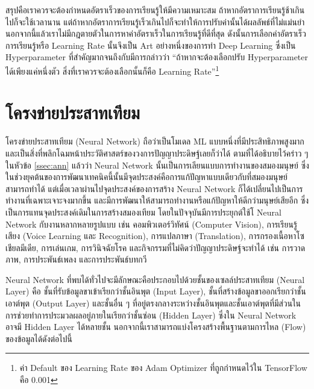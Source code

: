 สรุปคือเราควรจะต้องกำหนดอัตราเร็วของการเรียนรู้ให้มีความเหมาะสม ถ้าหากอัตราการเรียนรู้ช้าเกินไปก็จะใช้เวลานาน แต่ถ้าหากอัตราการเรียนรู้เร็วเกินไปก็จะทำให้การปรับค่านั้นได้ผลลัพธ์ที่ไม่แม่นยำ นอกจากนี้แล้วเราไม่มีกฎตายตัวในการหาค่าอัตราเร็วในการเรียนรู้ที่ดีที่สุด ดังนั้นการเลือกค่าอัตราเร็วการเรียนรู้หรือ Learning Rate นั้นจึงเป็น Art อย่างหนึ่งของการทำ Deep Learning ซึ่งเป็น Hyperparameter ที่สำคัญมากจนถึงกับมีการกล่าวว่า \enquote{ถ้าหากจะต้องเลือกปรับ Hyperparameter ได้เพียงแค่หนึ่งตัว สิ่งที่เราควรจะต้องเลือกนั้นก็คือ Learning Rate}\footnote{ค่า Default ของ Learning Rate ของ Adam Optimizer ที่ถูกกำหนดไว้ใน TensorFlow คือ 0.001}

\section{โครงข่ายประสาทเทียม}
\label{sec:nn}

โครงข่ายประสาทเทียม (Neural Network) ถือว่าเป็นโมเดล ML แบบหนึ่งที่มีประสิทธิภาพสูงมากและเป็นสิ่งที่พลิกโฉมหน้าประวัติศาสตร์ของวงการปัญญาประดิษฐ์เลยก็ว่าได้ ตามที่ได้อธิบายไว้คร่าว ๆ ในหัวข้อ \ref{ssec:ann} แล้วว่า Neural Network นั้นเป็นการเลียนแบบการทำงานของสมองมนุษย์ ซึ่งในช่วงยุคต้นของการพัฒนาเทคนิคนี้นั้นมีจุดประสงค์คือการแก้ปัญหาแบบเดียวกับที่สมองมนุษย์สามารถทำได้ แต่เมื่อเวลาผ่านไปจุดประสงค์ของการสร้าง Neural Network ก็ได้เปลี่ยนไปเป็นการทำงานที่เฉพาะเจาะจงมากขึ้น และมีการพัฒนาให้สามารถทำงานหรือแก้ปัญหาให้ดีกว่ามนุษย์เสียอีก ซึ่งเป็นการแทนจุดประสงค์เดิมในการสร้างสมองเทียม โดยในปัจจุบันมีการประยุกต์ใช้โ Neural Network กับงานหลากหลายรูปแบบ
เช่น คอมพิวเตอร์วิทัศน์ (Computer Vision), การเรียนรู้เสียง (Voice Learning และ Recognition), การแปลภาษา (Translation),
การกรองเนื้อหาโซเชียลมีเดีย, การเล่นเกม, การวินิจฉัยโรค และกิจกรรมที่ไม่คิดว่าปัญญาประดิษฐ์จะทำได้ เช่น การวาดภาพ, การประพันธ์เพลง
และการประพันธ์บทกวี

Neural Network ที่พบได้ทั่วไปจะมีลักษณะคือประกอบไปด้วยชั้นของเซลล์ประสาทเทียม (Neural Layer) คือ ชั้นที่รับข้อมูลขาเข้าเรียกว่าชั้นอินพุต
(Input Layer), ชั้นที่สร้างข้อมูลขาออกเรียกว่าชั้นเอาต์พุต (Output Layer) และชั้นอื่น ๆ ที่อยู่ตรงกลางระหว่างชั้นอินพุตและชั้นเอาต์พุตที่มีส่วนในการช่วยทำการประมวลผลอยู่ภายในเรียกว่าชั้นซ่อน (Hidden Layer) ซึ่งใน Neural Network อาจมี Hidden Layer ได้หลายชั้น
นอกจากนี้เราสามารถแบ่งโครงสร้างพื้นฐานตามการไหล (Flow) ของข้อมูลได้ดังต่อไปนี้

